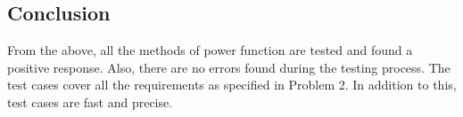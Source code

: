 \documentclass[a4paper,12pt]{article}
\begin{document}
    \subsection{Conclusion}
    From the above, all the methods of power function are tested and found a positive response. Also, there are no errors found during the testing process. The test cases cover all the requirements as specified in Problem 2. In addition to this, test cases are fast and precise.
\end{document}
